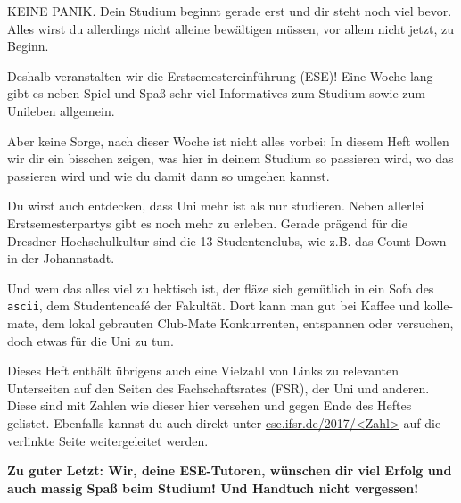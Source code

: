 
KEINE PANIK. 
Dein Studium beginnt gerade erst und dir steht noch viel bevor.
Alles wirst du allerdings nicht alleine bewältigen müssen, vor allem nicht jetzt, zu Beginn.

Deshalb veranstalten wir die Erstsemestereinführung (ESE)!
Eine Woche lang gibt es neben Spiel und Spaß sehr viel Informatives zum Studium sowie zum Unileben allgemein.

Aber keine Sorge, nach dieser Woche ist nicht alles vorbei: In diesem Heft wollen wir dir ein bisschen zeigen, was hier in deinem Studium so passieren wird, wo das passieren wird und wie du damit dann so umgehen kannst.

Du wirst auch entdecken, dass Uni mehr ist als nur studieren.
Neben allerlei Erstsemesterpartys gibt es noch mehr zu erleben.
Gerade prägend für die Dresdner Hochschulkultur sind die 13 Studentenclubs, wie z.B. das Count Down in der Johannstadt.

Und wem das alles viel zu hektisch ist, der fläze sich gemütlich in ein Sofa des \texttt{ascii}, dem Studentencafé der Fakultät. 
Dort kann man gut bei Kaffee und kolle-mate, dem lokal gebrauten Club-Mate Konkurrenten,  entspannen oder versuchen, doch etwas für die Uni zu tun.

Dieses Heft enthält übrigens auch eine Vielzahl von Links zu relevanten Unterseiten auf den Seiten des Fachschaftsrates (FSR), der Uni und anderen.
Diese sind mit Zahlen wie dieser hier  versehen und gegen Ende des Heftes gelistet. Ebenfalls kannst du auch direkt unter \url{ese.ifsr.de/2017/<Zahl>} auf die verlinkte Seite weitergeleitet werden.

\textbf{Zu guter Letzt: Wir, deine ESE-Tutoren, wünschen dir viel Erfolg und auch massig Spaß beim Studium! Und Handtuch nicht vergessen!}
